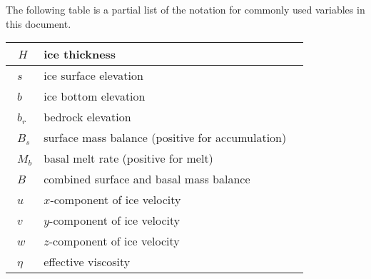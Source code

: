 The following table is a partial list of the notation for commonly used variables in this document.


\begin{center}
  \tablelasttail{\hline}
  \begin{supertabular}{|l|p{8cm}|c|}
    \hline

\ $H$   &    ice thickness  \\
\hline

\ $s$   &    ice surface elevation  \\
\hline

\ $b$   &    ice bottom elevation  \\
\hline

\ $b_r$   &    bedrock elevation  \\
\hline

\ $B_s$   &    surface mass balance (positive for accumulation) \\
\hline

\ $M_b$   &    basal melt rate (positive for melt) \\
\hline

\ $B$   &    combined surface and basal mass balance  \\
\hline

\ $u$   &    $x$-component of ice velocity  \\
\hline

\ $v$   &    $y$-component of ice velocity  \\
\hline

\ $w$   &    $z$-component of ice velocity  \\
\hline

\ $\eta$   &    effective viscosity  \\
\hline


  \end{supertabular}
\end{center}



